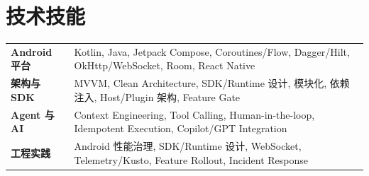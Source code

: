 \documentclass[11pt,a4paper]{article}
\begin{document}
\section{\faCogs\quad 技术技能}

\begin{tabularx}{\textwidth}{@{} >{\bfseries\color{primary}\small}l >{\small}X @{}}
Android 平台  & Kotlin, Java, Jetpack Compose, Coroutines/Flow, Dagger/Hilt, OkHttp/WebSocket, Room, React Native \\[3pt]
架构与 SDK    & MVVM, Clean Architecture, SDK/Runtime 设计, 模块化, 依赖注入, Host/Plugin 架构, Feature Gate \\[3pt]
Agent 与 AI   & Context Engineering, Tool Calling, Human-in-the-loop, Idempotent Execution, Copilot/GPT Integration \\[3pt]
工程实践      & Android 性能治理, SDK/Runtime 设计, WebSocket, Telemetry/Kusto, Feature Rollout, Incident Response \\
\end{tabularx}
\end{document}
